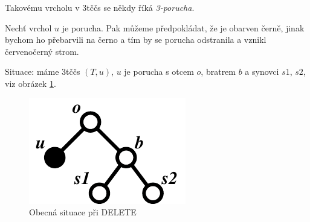 \begin{pozn}
Takovému vrcholu v 3tččs se někdy říká \emph{3-porucha}.
\end{pozn}

Nechť vrchol $u$  je porucha. Pak můžeme předpokládat, že je 
obarven černě, jinak bychom ho přebarvili na černo a tím by se porucha 
odstranila a vznikl červenočerný strom.

Situace: máme 3tččs $(T,u)$, $u$ je porucha s otcem $o$, bratrem $b$ a
synovci $s1$, $s2$, viz obrázek \ref{rbt-d}.

\begin{figure}[!htb]
\centering\includegraphics{pics/rbt-d}
\caption{Obecná situace při DELETE}
\label{rbt-d}
\end{figure}

